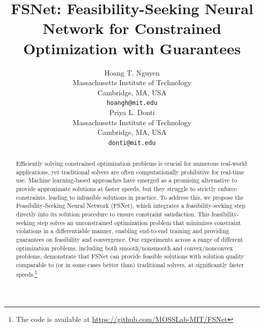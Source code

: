\documentclass{article}
\title{FSNet: Feasibility-Seeking Neural Network for Constrained Optimization with Guarantees}
\author{%
  Hoang T. Nguyen \\
  Massachusetts Institute of Technology \\
  Cambridge, MA, USA \\
  \texttt{hoangh@mit.edu} \\
  \And
  Priya L. Donti  \\
  Massachusetts Institute of Technology \\
  Cambridge, MA, USA \\
  \texttt{donti@mit.edu} \\
}
\begin{document}
\maketitle


\begin{abstract}
  Efficiently solving constrained optimization problems is crucial for numerous real-world applications, yet traditional solvers are often computationally prohibitive for real-time use. 
  Machine learning-based approaches have emerged as a promising alternative to provide approximate solutions at faster speeds, but they struggle to strictly enforce constraints, leading to infeasible solutions in practice. 
  To address this, we propose the Feasibility-Seeking Neural Network (FSNet), which integrates a feasibility-seeking step directly into its solution procedure to ensure constraint satisfaction. 
  This feasibility-seeking step solves an unconstrained optimization problem that minimizes constraint violations in a differentiable manner, enabling end-to-end training and providing guarantees on feasibility and convergence. 
  Our experiments across a range of different optimization problems, including both smooth/nonsmooth and convex/nonconvex problems, demonstrate that FSNet can provide feasible solutions with solution quality comparable to (or in some cases better than) traditional solvers, at significantly faster speeds.\footnote{The code is available at \url{https://github.com/MOSSLab-MIT/FSNet}}
\end{abstract}
\end{document}
